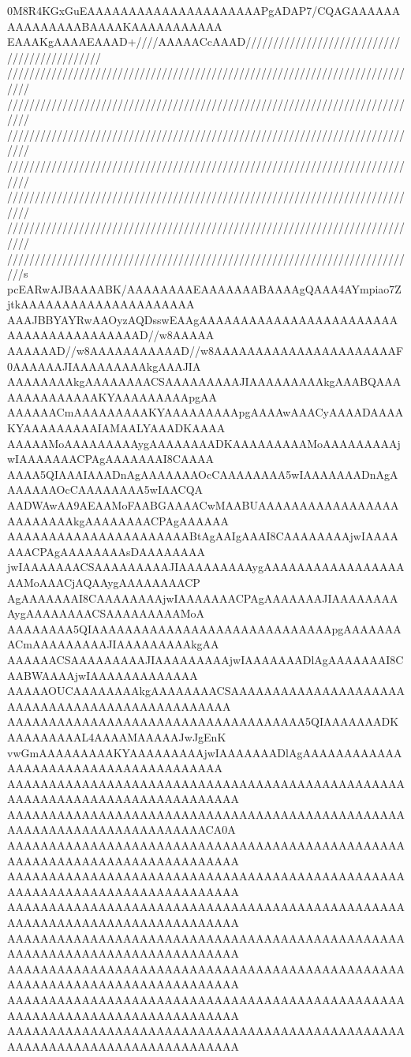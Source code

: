 0M8R4KGxGuEAAAAAAAAAAAAAAAAAAAAAPgADAP7/CQAGAAAAAAAAAAAAAAABAAAAKAAAAAAAAAAA
EAAAKgAAAAEAAAD+////AAAAACcAAAD/////////////////////////////////////////////
////////////////////////////////////////////////////////////////////////////
////////////////////////////////////////////////////////////////////////////
////////////////////////////////////////////////////////////////////////////
////////////////////////////////////////////////////////////////////////////
////////////////////////////////////////////////////////////////////////////
////////////////////////////////////////////////////////////////////////////
///////////////////////////////////////////////////////////////////////////s
pcEARwAJBAAAABK/AAAAAAAAEAAAAAAABAAAAgQAAA4AYmpiao7ZjtkAAAAAAAAAAAAAAAAAAAAA
AAAJBBYAYRwAAOyzAQDsswEAAgAAAAAAAAAAAAAAAAAAAAAAAAAAAAAAAAAAAAAAAAD//w8AAAAA
AAAAAAD//w8AAAAAAAAAAAD//w8AAAAAAAAAAAAAAAAAAAAAAF0AAAAAAJIAAAAAAAAAkgAAAJIA
AAAAAAAAkgAAAAAAAACSAAAAAAAAAJIAAAAAAAAAkgAAABQAAAAAAAAAAAAAAKYAAAAAAAAApgAA
AAAAAACmAAAAAAAAAKYAAAAAAAAApgAAAAwAAACyAAAADAAAAKYAAAAAAAAAIAMAALYAAADKAAAA
AAAAAMoAAAAAAAAAygAAAAAAAADKAAAAAAAAAMoAAAAAAAAAjwIAAAAAAACPAgAAAAAAAI8CAAAA
AAAA5QIAAAIAAADnAgAAAAAAAOcCAAAAAAAA5wIAAAAAAADnAgAAAAAAAOcCAAAAAAAA5wIAACQA
AADWAwAA9AEAAMoFAABGAAAACwMAABUAAAAAAAAAAAAAAAAAAAAAAAAAkgAAAAAAAACPAgAAAAAA
AAAAAAAAAAAAAAAAAAAAAABtAgAAIgAAAI8CAAAAAAAAjwIAAAAAAACPAgAAAAAAAAsDAAAAAAAA
jwIAAAAAAACSAAAAAAAAAJIAAAAAAAAAygAAAAAAAAAAAAAAAAAAAMoAAACjAQAAygAAAAAAAACP
AgAAAAAAAI8CAAAAAAAAjwIAAAAAAACPAgAAAAAAAJIAAAAAAAAAygAAAAAAAACSAAAAAAAAAMoA
AAAAAAAA5QIAAAAAAAAAAAAAAAAAAAAAAAAAAAAApgAAAAAAAACmAAAAAAAAAJIAAAAAAAAAkgAA
AAAAAACSAAAAAAAAAJIAAAAAAAAAjwIAAAAAAADlAgAAAAAAAI8CAABWAAAAjwIAAAAAAAAAAAAA
AAAAAOUCAAAAAAAAkgAAAAAAAACSAAAAAAAAAAAAAAAAAAAAAAAAAAAAAAAAAAAAAAAAAAAAAAAA
AAAAAAAAAAAAAAAAAAAAAAAAAAAAAAAAAAAA5QIAAAAAAADKAAAAAAAAAL4AAAAMAAAAAJwJgEnK
vwGmAAAAAAAAAKYAAAAAAAAAjwIAAAAAAADlAgAAAAAAAAAAAAAAAAAAAAAAAAAAAAAAAAAAAAAA
AAAAAAAAAAAAAAAAAAAAAAAAAAAAAAAAAAAAAAAAAAAAAAAAAAAAAAAAAAAAAAAAAAAAAAAAAAAA
AAAAAAAAAAAAAAAAAAAAAAAAAAAAAAAAAAAAAAAAAAAAAAAAAAAAAAAAAAAAAAAAAAAAAAAACA0A
AAAAAAAAAAAAAAAAAAAAAAAAAAAAAAAAAAAAAAAAAAAAAAAAAAAAAAAAAAAAAAAAAAAAAAAAAAAA
AAAAAAAAAAAAAAAAAAAAAAAAAAAAAAAAAAAAAAAAAAAAAAAAAAAAAAAAAAAAAAAAAAAAAAAAAAAA
AAAAAAAAAAAAAAAAAAAAAAAAAAAAAAAAAAAAAAAAAAAAAAAAAAAAAAAAAAAAAAAAAAAAAAAAAAAA
AAAAAAAAAAAAAAAAAAAAAAAAAAAAAAAAAAAAAAAAAAAAAAAAAAAAAAAAAAAAAAAAAAAAAAAAAAAA
AAAAAAAAAAAAAAAAAAAAAAAAAAAAAAAAAAAAAAAAAAAAAAAAAAAAAAAAAAAAAAAAAAAAAAAAAAAA
AAAAAAAAAAAAAAAAAAAAAAAAAAAAAAAAAAAAAAAAAAAAAAAAAAAAAAAAAAAAAAAAAAAAAAAAAAAA
AAAAAAAAAAAAAAAAAAAAAAAAAAAAAAAAAAAAAAAAAAAAAAAAAAAAAAAAAAAAAAAAAAAAAAAAAAAA
